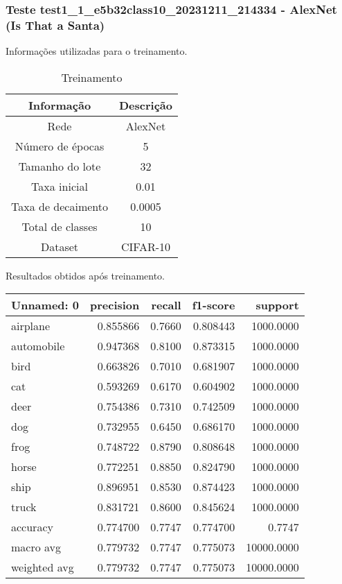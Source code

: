 \subsubsection{Teste test1_1_e5b32class10_20231211_214334 - AlexNet (Is That a Santa)}

Informações utilizadas para o treinamento.

\begin{table}[ht]
   \centering
   \caption{Treinamento}
   \label{tab:modelos}
   \begin{tabular}{| c | c | }
      \hline 
      \textbf{Informação} & \textbf{Descrição} \\
      \hline \hline 
      Rede & AlexNet \\
      \hline
      Número de épocas & 5\\
      \hline
      Tamanho do lote & 32\\
      \hline
      Taxa inicial & 0.01 \\
      \hline
      Taxa de decaimento & 0.0005 \\
      \hline
      Total de classes & 10\\
      \hline
      Dataset & CIFAR-10\\
      \hline
   \end{tabular} 
\end{table}

Resultados obtidos após treinamento.

\begin{tabular}{lrrrr}
\toprule
  Unnamed: 0 &  precision &  recall &  f1-score &    support \\
\midrule
    airplane &   0.855866 &  0.7660 &  0.808443 &  1000.0000 \\
  automobile &   0.947368 &  0.8100 &  0.873315 &  1000.0000 \\
        bird &   0.663826 &  0.7010 &  0.681907 &  1000.0000 \\
         cat &   0.593269 &  0.6170 &  0.604902 &  1000.0000 \\
        deer &   0.754386 &  0.7310 &  0.742509 &  1000.0000 \\
         dog &   0.732955 &  0.6450 &  0.686170 &  1000.0000 \\
        frog &   0.748722 &  0.8790 &  0.808648 &  1000.0000 \\
       horse &   0.772251 &  0.8850 &  0.824790 &  1000.0000 \\
        ship &   0.896951 &  0.8530 &  0.874423 &  1000.0000 \\
       truck &   0.831721 &  0.8600 &  0.845624 &  1000.0000 \\
    accuracy &   0.774700 &  0.7747 &  0.774700 &     0.7747 \\
   macro avg &   0.779732 &  0.7747 &  0.775073 & 10000.0000 \\
weighted avg &   0.779732 &  0.7747 &  0.775073 & 10000.0000 \\
\bottomrule
\end{tabular}


